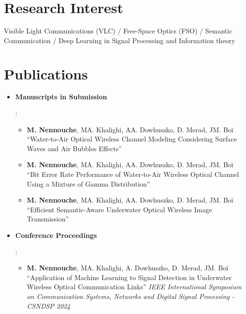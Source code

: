 \documentclass[a4paper,20pt]{article}
\newcommand{\resumeItem}[2]{
  \item\small{
    \textbf{#1}{: #2 \vspace{-2pt}}
  }
}
\newcommand{\resumeSubItem}[2]{\resumeItem{#1}{#2}\vspace{-3pt}}
\newcommand{\resumeSubHeadingListStart}{\begin{itemize}[leftmargin=*]}
\newcommand{\resumeSubHeadingListEnd}{\end{itemize}}
\begin{document}
\vspace{-5pt}
\section{Research Interest}
\begin{description}[font=$\bullet$]
  \item Visible Light Communications (VLC) / Free-Space Optics (FSO) / Semantic Communication / Deep Learning in Signal Processing and Information theory
\end{description}

\vspace{-5pt}
\section{Publications}
  \resumeSubHeadingListStart
  \resumeSubItem{Manuscripts in Submission}{
    \begin{itemize}
      \item \textbf{M. Nennouche}, MA. Khalighi, AA.  Dowhuszko, D. Merad, JM. Boï ``Water-to-Air Optical Wireless Channel Modeling Considering Surface Waves and Air Bubbles Effects''
      \item \textbf{M. Nennouche}, MA. Khalighi, AA. Dowhuszko, D. Merad, JM. Boï ``Bit Error Rate Performance of Water-to-Air Wireless Optical Channel Using a Mixture of Gamma Distribution''
      \item \textbf{M. Nennouche}, MA. Khalighi, AA. Dowhuszko, D. Merad, JM. Boï ``Efficient Semantic-Aware Underwater Optical Wireless Image Transmission''
    \end{itemize}
  }
  \vspace{2pt}
  \resumeSubItem{Conference Proceedings}{
    \begin{itemize}
      \item \textbf{M. Nennouche}, MA. Khalighi, A. Dowhuszko, D. Merad, JM. Boï ``Application of Machine Learning to Signal Detection in Underwater Wireless Optical Communication Links'' \textit{IEEE International Symposium on Communication Systems, Networks and Digital Signal Processing - CSNDSP 2024}
    \end{itemize}
  }
  \resumeSubHeadingListEnd

\vspace{-5pt}
\end{document}
